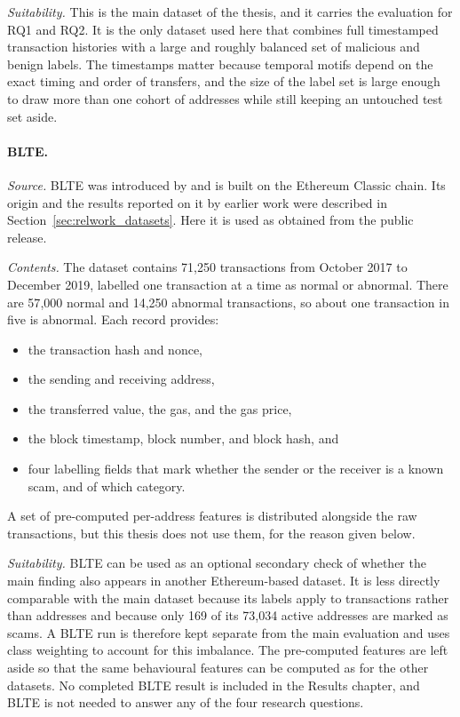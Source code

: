 \textit{Suitability.} This is the main dataset of the thesis, and it carries the
evaluation for RQ1 and RQ2. It is the only dataset used here that
combines full timestamped transaction histories with a large and roughly
balanced set of malicious and benign labels. The timestamps matter because
temporal motifs depend on the exact timing and order of transfers, and the size
of the label set is large enough to draw more than one cohort of addresses while
still keeping an untouched test set aside.

\paragraph{BLTE.}
\label{sec:dataset_blte}
\textit{Source.} BLTE was introduced by \citet{alemari2021labeled} and is built
on the Ethereum Classic chain. Its origin and the results reported on it by
earlier work were described in Section~\ref{sec:relwork_datasets}. Here it is
used as obtained from the public release.

\textit{Contents.} The dataset contains 71{,}250 transactions from October 2017
to December 2019, labelled one transaction at a time as normal or abnormal.
There are 57{,}000 normal and 14{,}250 abnormal transactions, so about one
transaction in five is abnormal. Each record provides:
\begin{itemize}
  \item the transaction hash and nonce,
  \item the sending and receiving address,
  \item the transferred value, the gas, and the gas price,
  \item the block timestamp, block number, and block hash, and
  \item four labelling fields that mark whether the sender or the receiver is a
        known scam, and of which category.
\end{itemize}
A set of pre-computed per-address features is distributed alongside the raw
transactions, but this thesis does not use them, for the reason given below.

\textit{Suitability.} BLTE can be used as an optional secondary check of whether
the main finding also appears in another Ethereum-based dataset. It is less
directly comparable with the main dataset because its labels apply to
transactions rather than addresses and because only 169 of its 73{,}034 active
addresses are marked as scams. A BLTE run is therefore kept separate from the
main evaluation and uses class weighting to account for this imbalance. The
pre-computed features are left aside so that the same behavioural features can
be computed as for the other datasets. No completed BLTE result is included in
the Results chapter, and BLTE is not needed to answer any of the four research
questions.

